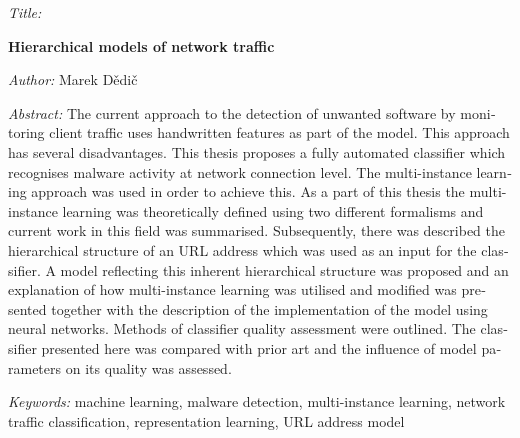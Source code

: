 \begin{english}
	\begin{onehalfspace}
		\noindent \textit{Title:}

		\noindent \textbf{Hierarchical models of network traffic}
	\end{onehalfspace}

	\bigskip

	\noindent \textit{Author:} Marek Dědič

	\bigskip

	\noindent \textit{Abstract:}
	\textenglish{The current approach to the detection of unwanted software by monitoring client traffic uses handwritten features as part of the model. This approach has several disadvantages. This thesis proposes a fully automated classifier which recognises malware activity at network connection level. The multi-instance learning approach was used in order to achieve this. As a part of this thesis the multi-instance learning was theoretically defined using two different formalisms and current work in this field was summarised. Subsequently, there was described the hierarchical structure of an URL address which was used as an input for the classifier. A model reflecting this inherent hierarchical structure was proposed and an explanation of how multi-instance learning was utilised and modified was presented together with the description of the implementation of the model using neural networks. Methods of classifier quality assessment were outlined. The classifier presented here was compared with prior art and the influence of model parameters on its quality was assessed.}

	\bigskip

	\noindent \textit{Keywords:}
	\textenglish{machine learning, malware detection, multi-instance learning, network traffic classification, representation learning, URL address model}

\end{english}
